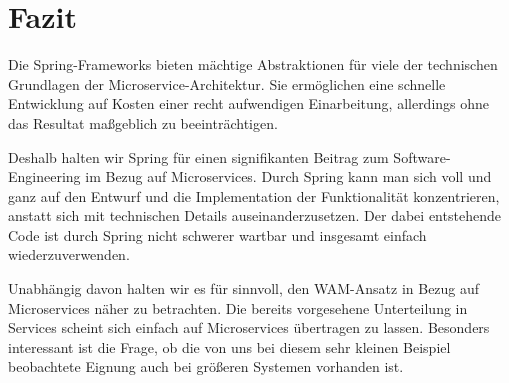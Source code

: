 \documentclass{article}
\begin{document}
\section{Fazit}

Die Spring-Frameworks bieten mächtige Abstraktionen für viele der technischen Grundlagen der Microservice-Architektur.
Sie ermöglichen eine schnelle Entwicklung auf Kosten einer recht aufwendigen Einarbeitung, allerdings ohne das Resultat maßgeblich zu beeinträchtigen.

Deshalb halten wir Spring für einen signifikanten Beitrag zum Software-Engineering im Bezug auf Microservices.
Durch Spring kann man sich voll und ganz auf den Entwurf und die Implementation der Funktionalität konzentrieren, anstatt sich mit technischen Details auseinanderzusetzen.
Der dabei entstehende Code ist durch Spring nicht schwerer wartbar und insgesamt einfach wiederzuverwenden.

Unabhängig davon halten wir es für sinnvoll, den WAM-Ansatz in Bezug auf Microservices näher zu betrachten.
Die bereits vorgesehene Unterteilung in Services scheint sich einfach auf Microservices übertragen zu lassen.
Besonders interessant ist die Frage, ob die von uns bei diesem sehr kleinen Beispiel beobachtete Eignung auch bei größeren Systemen vorhanden ist.



\end{document}

